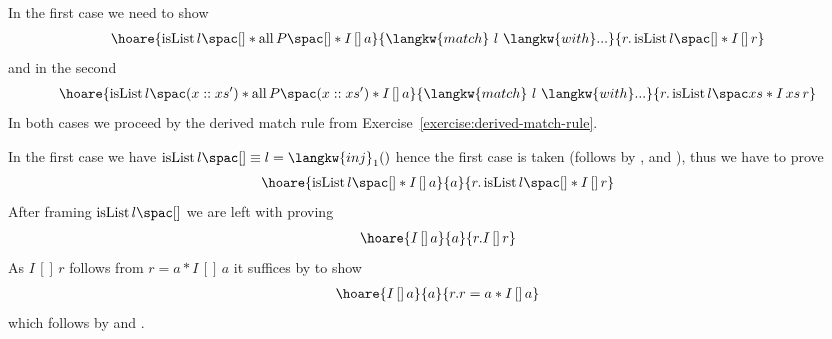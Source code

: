In the first case we need to show
\begin{align*}
\hoare{ \isList {l} {[]} \ast \all {P} {[]} \ast  I \, [] \, a}
{\langkw{match}\ l\ \langkw{with} ...}
{r.  \isList {l} {[]} \ast I \, []\, r} 
\end{align*}
and in the second
\begin{align*}
\hoare{ \isList {l} {(x::xs')} \ast \all {P} {(x::xs')} \ast  I \, [] \, a}
{\langkw{match}\ l\ \langkw{with} ...}
{r.  \isList {l} {xs} \ast I \, xs\, r}
\end{align*}
In both cases we proceed by the derived match rule from Exercise~\ref{exercise:derived-match-rule}.

In the first case we have $\isList {l} {[]} \equiv l = \langkw{inj}_1()$ hence the first case is taken (follows by ,  and ), thus we have to prove
\begin{align*}
\hoare{ \isList {l} {[]} \ast  I \, [] \, a}{a}{r.  \isList {l} {[]} \ast I \, []\, r} 
\end{align*}
After framing $ \isList {l} {[]} $ we are left with proving
\begin{align*}
\hoare{ I \, [] \, a}{a}{r. I\, [] \, r} 
\end{align*}
As $I \, [] \, r $ follows from $r = a \ast I \, [] \, a$ it suffices by  to show
\begin{align*}
\hoare{ I \, [] \, a}{a}{r.r=a \ast I \, [] \, a }
\end{align*}
which follows by  and .

